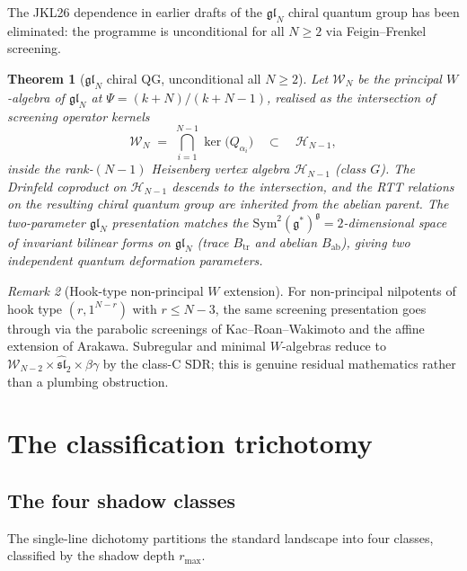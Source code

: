 \documentclass[11pt]{article}
\theoremstyle{plain}
\newtheorem{theorem}{Theorem}[section]
\theoremstyle{definition}
\theoremstyle{remark}
\newtheorem{remark}[theorem]{Remark}
\newcommand{\fg}{\mathfrak{g}}
\newcommand{\fsl}{\mathfrak{sl}}
\newcommand{\cH}{\mathcal{H}}
\newcommand{\cW}{\mathcal{W}}
\begin{document}
The JKL26 dependence in earlier drafts of the $\mathfrak{gl}_N$ chiral
quantum group has been eliminated: the programme is unconditional for
all $N \geq 2$ via Feigin--Frenkel screening.

\begin{theorem}[$\mathfrak{gl}_N$ chiral QG,
unconditional all $N \geq 2$]\label{thm:glN-feigin-frenkel-sf}
\ClaimStatusProvedElsewhere
Let $\cW_N$ be the principal $W$-algebra of $\mathfrak{gl}_N$ at
$\Psi = (k+N)/(k+N-1)$, realised as the intersection of screening
operator kernels
\[
 \cW_N \;=\; \bigcap_{i=1}^{N-1} \ker\bigl(Q_{\alpha_i}\bigr)
 \quad\subset\quad \cH_{N-1},
\]
inside the rank-$(N-1)$ Heisenberg vertex algebra $\cH_{N-1}$ (class
$G$). The Drinfeld coproduct on $\cH_{N-1}$ descends to the
intersection, and the RTT relations on the resulting chiral quantum
group are inherited from the abelian parent. The two-parameter
$\mathfrak{gl}_N$ presentation matches the $\mathrm{Sym}^2(\fg^*)^\fg
= 2$-dimensional space of invariant bilinear forms on $\mathfrak{gl}_N$
(trace $B_{\mathrm{tr}}$ and abelian $B_{\mathrm{ab}}$), giving two
independent quantum deformation parameters.
\end{theorem}

\begin{remark}[Hook-type non-principal $W$ extension]
\label{rem:hook-extension-sf}
For non-principal nilpotents of hook type $(r, 1^{N-r})$ with
$r \leq N-3$, the same screening presentation goes through via the
parabolic screenings of Kac--Roan--Wakimoto and the affine extension
of Arakawa. Subregular and minimal $W$-algebras reduce to
$\cW_{N-2} \times \widehat{\fsl}_2 \times \beta\gamma$ by the class-C
SDR; this is genuine residual mathematics rather than a plumbing
obstruction.
\end{remark}


\section{The classification trichotomy}\label{sec:trichotomy}

\subsection{The four shadow classes}

The single-line dichotomy partitions the standard landscape into
four classes, classified by the shadow depth $r_{\max}$.
\end{document}
